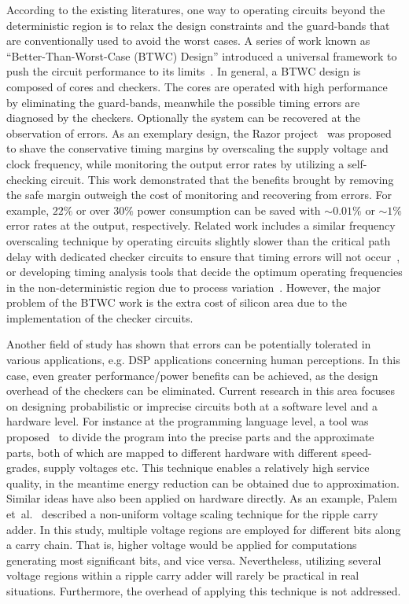 \documentclass[prodmode,acmtrets]{acmsmall} %
\begin{document}
According to the existing literatures, one way to operating circuits beyond the deterministic region is to relax the design constraints and the guard-bands that are conventionally used to avoid the worst cases. A series of work known as ``Better-Than-Worst-Case (BTWC) Design'' introduced a universal framework to push the circuit performance to its limits~\cite{BetterThanWS2005}. In general, a BTWC design is composed of cores and checkers. The cores are operated with high performance by eliminating the guard-bands, meanwhile the possible timing errors are diagnosed by the checkers. Optionally the system can be recovered at the observation of errors. As an exemplary design, the Razor project~\cite{Razor2003,Razor2004} was proposed to shave the conservative timing margins by overscaling the supply voltage and clock frequency, while monitoring the output error rates by utilizing a self-checking circuit. This work demonstrated that the benefits brought by removing the safe margin outweigh the cost of monitoring and recovering from errors. For example, $22\%$ or over $30\%$ power consumption can be saved with $\sim0.01\%$ or $\sim1\%$ error rates at the output, respectively. Related work includes a similar frequency overscaling technique by operating circuits slightly slower than the critical path delay with dedicated checker circuits to ensure that timing errors will not occur~\cite{TEAtime2004}, or developing timing analysis tools that decide the optimum operating frequencies in the non-deterministic region due to process variation~\cite{ProbabilisticSTA}. However, the major problem of the BTWC work is the extra cost of silicon area due to the implementation of the checker circuits.

Another field of study has shown that errors can be potentially tolerated in various applications, e.g. DSP applications concerning human perceptions. In this case, even greater performance/power benefits can be achieved, as the design overhead of the checkers can be eliminated. Current research in this area focuses on designing probabilistic or imprecise circuits both at a software level and a hardware level. For instance at the programming language level, a tool was proposed~\cite{EnerJ2011Uwash,Truffle2012Uwash} to divide the program into the precise parts and the approximate parts, both of which are mapped to different hardware with different speed-grades, supply voltages etc. This technique enables a relatively high service quality, in the meantime energy reduction can be obtained due to approximation. Similar ideas have also been applied on hardware directly. As an example, Palem et~al.~\cite{NonUniformScaling} described a non-uniform voltage scaling technique for the ripple carry adder. In this study, multiple voltage regions are employed for different bits along a carry chain. That is, higher voltage would be applied for computations generating most significant bits, and vice versa. Nevertheless, utilizing several voltage regions within a ripple carry adder will rarely be practical in real situations. Furthermore, the overhead of applying this technique is not addressed.
\end{document}
